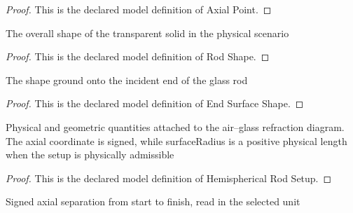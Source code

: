 \begin{proof}
  This is the declared model definition of Axial Point.
\end{proof}
\begin{definition}
  \label{def:physics:phyx-mini-0040:phyxminiproblems-problemphyxmini0040-rodshape}
  The overall shape of the transparent solid in the physical scenario
\end{definition}
\begin{proof}
  This is the declared model definition of Rod Shape.
\end{proof}
\begin{definition}
  \label{def:physics:phyx-mini-0040:phyxminiproblems-problemphyxmini0040-endsurfaceshape}
  The shape ground onto the incident end of the glass rod
\end{definition}
\begin{proof}
  This is the declared model definition of End Surface Shape.
\end{proof}
\begin{definition}
  \label{def:physics:phyx-mini-0040:phyxminiproblems-problemphyxmini0040-hemisphericalrodsetup}
  Physical and geometric quantities attached to the air--glass refraction diagram. The axial coordinate is signed, while surfaceRadius is a positive physical length when the setup is physically admissible
\end{definition}
\begin{proof}
  This is the declared model definition of Hemispherical Rod Setup.
\end{proof}
\begin{definition}
  \label{def:physics:phyx-mini-0040:phyxminiproblems-problemphyxmini0040-axialseparationreadout}
  Signed axial separation from start to finish, read in the selected unit
\end{definition}
